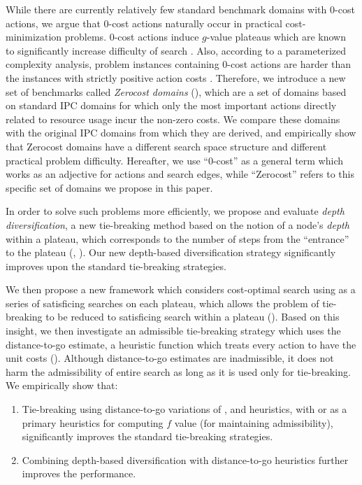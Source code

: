 While there are currently relatively few standard benchmark domains with 0-cost actions,
we argue that 0-cost actions naturally occur in
practical cost-minimization problems.
0-cost actions induce $g$-value plateaus which are known to significantly increase difficulty of search \cite{benton2010g}.
Also, according to a parameterized complexity analysis, problem instances containing 0-cost actions are harder than the instances with strictly positive action costs \cite{aghighi2015}.
Therefore, we introduce a new set of benchmarks called \emph{Zerocost domains}
(), which are a set of domains based on standard IPC domains for which only the most important actions directly related to resource usage incur the non-zero costs.
We compare these domains with the original IPC domains from which they are derived, and empirically show that 
Zerocost domains have a different search space structure and different practical problem difficulty.
Hereafter, we use ``0-cost'' as a general term which works as an adjective for actions and search edges, while ``Zerocost'' refers to this specific set of domains we propose in this paper.

In order to solve such problems more efficiently, we propose and
evaluate \emph{depth diversification}, a new
tie-breaking method based on the notion of a node's \emph{depth} within a plateau,
which corresponds to the number of steps from the ``entrance'' to
the plateau (,
). 
Our new depth-based diversification strategy significantly improves upon the 
standard tie-breaking strategies.

We then propose a new framework which considers cost-optimal search using \astar 
as a series of satisficing searches on each plateau,
which allows the problem of tie-breaking to be reduced to satisficing search within a plateau ().
Based on this insight, we then investigate an
admissible tie-breaking strategy which uses the distance-to-go estimate, a heuristic function which treats every action
to have the unit costs ().
Although distance-to-go estimates are inadmissible,
it does not harm the admissibility of entire search as long as it is used only for tie-breaking.
% 
We empirically show that:
\begin{enumerate}
 \item Tie-breaking using distance-to-go variations of \lmcut, \mands and \ff heuristics,
       with \lmcut or \mands as a primary heuristics for computing $f$ value (for maintaining admissibility),
       significantly improves the standard tie-breaking strategies.
 \item Combining depth-based diversification with distance-to-go heuristics 
       further improves the performance.
\end{enumerate}

